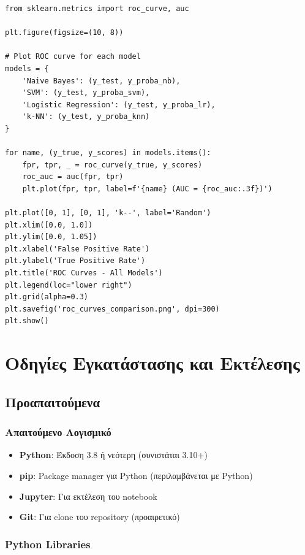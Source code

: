 \documentclass[12pt,a4paper,twoside]{book}
\begin{document}
\begin{tcolorbox}[myCustomStyle={ROC Curves for All Models}]
    \begin{lstlisting}[style=myPythonStyle]
from sklearn.metrics import roc_curve, auc

plt.figure(figsize=(10, 8))

# Plot ROC curve for each model
models = {
    'Naive Bayes': (y_test, y_proba_nb),
    'SVM': (y_test, y_proba_svm),
    'Logistic Regression': (y_test, y_proba_lr),
    'k-NN': (y_test, y_proba_knn)
}

for name, (y_true, y_scores) in models.items():
    fpr, tpr, _ = roc_curve(y_true, y_scores)
    roc_auc = auc(fpr, tpr)
    plt.plot(fpr, tpr, label=f'{name} (AUC = {roc_auc:.3f})')

plt.plot([0, 1], [0, 1], 'k--', label='Random')
plt.xlim([0.0, 1.0])
plt.ylim([0.0, 1.05])
plt.xlabel('False Positive Rate')
plt.ylabel('True Positive Rate')
plt.title('ROC Curves - All Models')
plt.legend(loc="lower right")
plt.grid(alpha=0.3)
plt.savefig('roc_curves_comparison.png', dpi=300)
plt.show()
\end{lstlisting}
\end{tcolorbox}

\chapter{Οδηγίες Εγκατάστασης και Εκτέλεσης}

\section{Προαπαιτούμενα}

\subsection{Απαιτούμενο Λογισμικό}

\begin{itemize}
    \item \textbf{Python}: Έκδοση 3.8 ή νεότερη (συνιστάται 3.10+)
    \item \textbf{pip}: Package manager για Python (περιλαμβάνεται με Python)
    \item \textbf{Jupyter}: Για εκτέλεση του notebook
    \item \textbf{Git}: Για clone του repository (προαιρετικό)
\end{itemize}

\subsection{Python Libraries}
\end{document}
